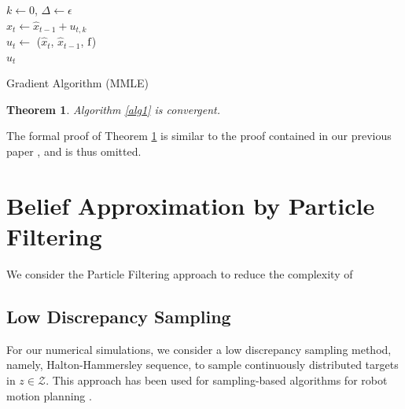 \documentclass[letterpaper, 10 pt, conference]{ieeeconf}
\newtheorem{theorem}{Theorem}[section]
\newcommand{\Ram}[1]{{\normalsize{\textbf{({\color{green}Ram:\ }#1)}}}}
\newcommand{\HJ}[1]{{\color{black}{#1}}}
\begin{document}
{\tiny{
		\begin{algorithm}
			\DontPrintSemicolon
			$k \gets 0$, $\Delta \gets \epsilon$\\
$\hat{x}_t \gets \hat{x}_{t-1}+ u_{t,k}$ \\
$\hat{u}_{t}\gets$ ($\hat{x}_{t}$, $\hat{x}_{t-1}$, $\textup{f}$) \\
\Return $\hat{u}_t$
			\caption{Gradient Algorithm (MMLE)}\label{alg1}
		\end{algorithm}
}}

\begin{theorem}
	Algorithm \ref{alg1} is convergent.
	\label{thm1}
\end{theorem}
The formal proof of Theorem \ref{thm1} is similar to the proof
contained in our previous paper \cite{park2014robust}, and is thus omitted.

\section{Belief Approximation by Particle Filtering}
\label{sec:sec6}
We consider the Particle Filtering approach to reduce the complexity of \HJ{the map reconstruction process.} 

\subsection{Low Discrepancy Sampling} 
For our numerical simulations, we consider a low discrepancy sampling method, namely, Halton-Hammersley sequence, to sample continuously distributed targets in $z \in \mathcal{Z}$. 
This approach has been used for sampling-based algorithms for robot motion planning \cite{lavalle2006planning}.
\end{document}
